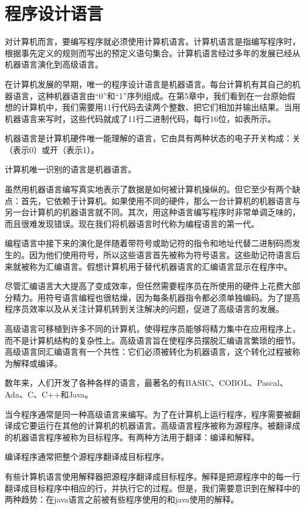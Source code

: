 \chapter{程序设计语言}
对计算机而言，要编写程序就必须使用计算机语言。计算机语言是指编写程序时，根据事先定义的规则而写出的预定义语句集合。计算机语言经过多年的发展已经从机器语言演化到高级语言。

在计算机发展的早期，唯一的程序设计语言是机器语言。每台计算机有其自己的机器语言，这种机器语言由“0”和“1”序列组成。在第5章中，我们看到在一台原始假想的计算机中，我们需要用11行代码去读两个整数、把它们相加并输出结果。当用机器语言来写时，这些代码就成了11行二进制代码，每行16位，如表所示。

机器语言是计算机硬件唯一能理解的语言，它由具有两种状态的电子开关构成：关（表示0）或开（表示1）。

计算机唯一识别的语言是机器语言。

虽然用机器语言编写真实地表示了数据是如何被计算机操纵的。但它至少有两个缺点：首先，它依赖于计算机。如果使用不同的硬件，那么一台计算机的机器语言与另一台计算机的机器语言就不同。其次，用这种语言编写程序时非常单调乏味的，而且很难发现错误。现在我们将机器语言时代称为编程语言的第一代。

编程语言中接下来的演化是伴随着带符号或助记符的指令和地址代替二进制码而发生的。因为他们使用符号，所以这些语言首先被称为符号语言。这些助记符语言后来就被称为汇编语言。假想计算机用于替代机器语言的汇编语言显示在程序中。

尽管汇编语言大大提高了变成效率，但任然需要程序员在所使用的硬件上花费大部分精力。用符号语言编程也很枯燥，因为每条机器指令都必须单独编码。为了提高程序员效率以及从关注计算机转到关注解决的问题，促进了高级语言的发展。

高级语言可移植到许多不同的计算机，使得程序员能够将精力集中在应用程序上，而不是计算机结构的复杂性上。高级语言旨在使程序员摆脱汇编语言繁琐的细节。高级语言同汇编语言有一个共性：它们必须被转化为机器语言，这个转化过程被称为解释或编译。

数年来，人们开发了各种各样的语言，最著名的有BASIC、COBOL、Pascal、Ada、C、C++和Java。

当今程序通常是同一种高级语言来编写。为了在计算机上运行程序，程序需要被翻译成它要运行在其他的计算机的机器语言。高级语言程序被称为源程序。被翻译成的机器语言程序被称为目标程序。有两种方法用于翻译：编译和解释。

编译程序通常把整个源程序翻译成目标程序。

有些计算机语言使用解释器把源程序翻译成目标程序。解释是把源程序中的每一行翻译成目标程序中相应的行，并执行它的过程。但是，我们需要意识到在解释中的两种趋势：在java语言之前被有些程序使用的和java使用的解释。

